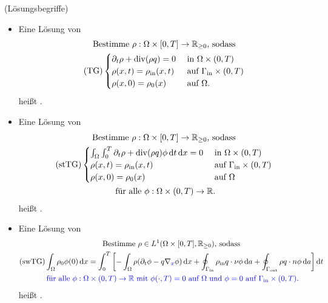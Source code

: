 \begin{define}(Lösungsbegriffe)
	
	\begin{itemize}
		\item Eine Lösung von
		\begin{gather*}
		\text{Bestimme } \rho: \Omega \times [0,T] \to \mathbb{R}_{\geq 0} \text{, sodass}\\
		\operatorname{(TG)}
		\begin{cases}
		\partial_t \rho + \operatorname{div}(\rho q) = 0 &\text{ in } \Omega \times (0,T)\\
		\rho(x,t) = \rho_{\text{in}}(x,t) &\text{ auf } \Gamma_{\text{in}} \times (0,T)\\
		\rho(x,0) = \rho_0(x) &\text{ auf } \Omega.
		\end{cases}
		\end{gather*}
		heißt .
		\item Eine Lösung von 
		\begin{gather*}
		\text{Bestimme } \rho: \Omega \times [0,T] \to \mathbb{R}_{\geq 0} \text{, sodass}\\
		\operatorname{(stTG)}
		\begin{cases}
		\int_{\Omega} \int_{0}^{T} \partial_t \rho + \operatorname{div}(\rho q) \phi \mathop{}\!\mathrm{d} t \mathop{}\!\mathrm{d} x = 0 &\text{ in } \Omega \times (0,T)\\
		\rho(x,t) = \rho_{\text{in}}(x,t) &\text{ auf } \Gamma_{\text{in}} \times (0,T)\\
		\rho(x,0) = \rho_0(x) &\text{ auf } \Omega
		\end{cases}\\
		\text{ für alle } \phi: \Omega \times (0,T) \to \mathbb{R}.
		\end{gather*}
		heißt .
		\item Eine Lösung von 
		\begin{gather*}
		\text{Bestimme } \rho \in L^1(\Omega \times [0,T], \mathbb{R}_{\geq 0}) \text{, sodass}\\
		\operatorname{(swTG)}
		\int_{\Omega} \rho_0 \phi(0) \mathop{}\!\mathrm{d} x = \int_{0}^{T} \left[ - \int_{\Omega} \rho (\partial_t \phi - q \nabla_{\textcolor{blue}{x}} \phi ) \mathop{}\!\mathrm{d} x + \oint_{\Gamma_{\text{in}}} \rho_{\text{in}} q \cdot \nu \phi \mathop{}\!\mathrm{d} a + \oint_{\Gamma_{\text{out}}} \rho q \cdot n \phi \mathop{}\!\mathrm{d} a \right] \mathop{}\!\mathrm{d} t\\
		\textcolor{blue}{\text{ für alle } \phi: \Omega \times (0,T) \to \mathbb{R} \text{ mit } \phi(\cdot,T) = 0 \text{ auf } \Omega \text{ und } \phi = 0 \text{ auf } \Gamma_{\text{in}} \times (0,T).}
		\end{gather*}
		heißt .
	\end{itemize}
\end{define}

